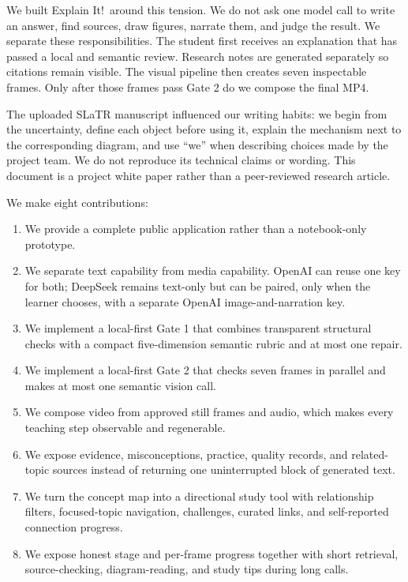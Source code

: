 \documentclass[11pt]{article}
\newcommand{\product}{Explain It!}
\theoremstyle{plain}
\theoremstyle{definition}
\begin{document}
We built \product\ around this tension. We do not ask one model call to write an answer, find sources, draw figures, narrate them, and judge the result. We separate these responsibilities. The student first receives an explanation that has passed a local and semantic review. Research notes are generated separately so citations remain visible. The visual pipeline then creates seven inspectable frames. Only after those frames pass Gate 2 do we compose the final MP4.

The uploaded SLaTR manuscript influenced our writing habits: we begin from the uncertainty, define each object before using it, explain the mechanism next to the corresponding diagram, and use ``we'' when describing choices made by the project team. We do not reproduce its technical claims or wording. This document is a project white paper rather than a peer-reviewed research article.

We make eight contributions:
\begin{enumerate}
  \item We provide a complete public application rather than a notebook-only prototype.
  \item We separate text capability from media capability. OpenAI can reuse one key for both; DeepSeek remains text-only but can be paired, only when the learner chooses, with a separate OpenAI image-and-narration key.
  \item We implement a local-first Gate 1 that combines transparent structural checks with a compact five-dimension semantic rubric and at most one repair.
  \item We implement a local-first Gate 2 that checks seven frames in parallel and makes at most one semantic vision call.
  \item We compose video from approved still frames and audio, which makes every teaching step observable and regenerable.
  \item We expose evidence, misconceptions, practice, quality records, and related-topic sources instead of returning one uninterrupted block of generated text.
  \item We turn the concept map into a directional study tool with relationship filters, focused-topic navigation, challenges, curated links, and self-reported connection progress.
  \item We expose honest stage and per-frame progress together with short retrieval, source-checking, diagram-reading, and study tips during long calls.
\end{enumerate}
\end{document}
